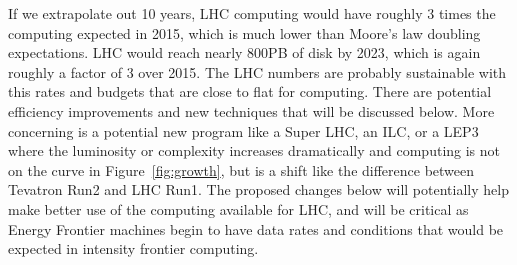 If we extrapolate out 10 years, LHC computing would have roughly 3
times the computing expected in 2015, which is much lower than Moore's
law doubling expectations.  LHC would reach nearly 800PB of disk by
2023, which is again roughly a factor of 3 over 2015.  The LHC numbers
are probably sustainable with this rates and budgets that are close to
flat for computing.  There are potential efficiency improvements and
new techniques that will be discussed below.  More concerning is a
potential new program like a Super LHC, an ILC, or a LEP3 where the
luminosity or complexity increases dramatically and computing is not
on the curve in Figure~\ref{fig:growth}, but is a shift like the
difference between Tevatron Run2 and LHC Run1.  The proposed changes
below will potentially help make better use of the computing available
for LHC, and will be critical as Energy Frontier machines begin to
have data rates and conditions that would be expected in intensity
frontier computing.

